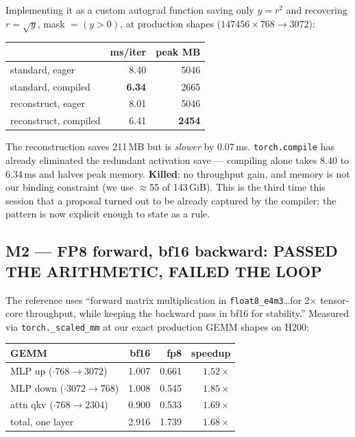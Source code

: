 \documentclass{article}
\begin{document}
Implementing it as a custom autograd function saving only $y=r^2$ and recovering $r=\sqrt{y}$, mask $=(y>0)$, at production shapes ($147456\times768\to3072$):

\begin{center}\begin{small}
\begin{tabular}{lrr}
\toprule
 & ms/iter & peak MB \\
\midrule
standard, eager & 8.40 & 5046 \\
standard, compiled & \textbf{6.34} & 2665 \\
reconstruct, eager & 8.01 & 5046 \\
reconstruct, compiled & 6.41 & \textbf{2454} \\
\bottomrule
\end{tabular}
\end{small}\end{center}

The reconstruction saves 211\,MB but is \emph{slower} by 0.07\,ms. \texttt{torch.compile} has already eliminated the redundant activation save --- compiling alone takes 8.40 to 6.34\,ms and halves peak memory. \textbf{Killed}: no throughput gain, and memory is not our binding constraint (we use $\approx$55 of 143\,GiB). This is the third time this session that a proposal turned out to be already captured by the compiler; the pattern is now explicit enough to state as a rule.

\subsection{M2 --- FP8 forward, bf16 backward: PASSED THE ARITHMETIC, FAILED THE LOOP}
The reference uses ``forward matrix multiplication in \texttt{float8\_e4m3}\ldots for 2$\times$ tensor-core throughput, while keeping the backward pass in bf16 for stability.'' Measured via \texttt{torch.\_scaled\_mm} at our exact production GEMM shapes on H200:

\begin{center}\begin{small}
\begin{tabular}{lrrr}
\toprule
GEMM & bf16 & fp8 & speedup \\
\midrule
MLP up ($\cdot768{\to}3072$) & 1.007 & 0.661 & $1.52\times$ \\
MLP down ($\cdot3072{\to}768$) & 1.008 & 0.545 & $1.85\times$ \\
attn qkv ($\cdot768{\to}2304$) & 0.900 & 0.533 & $1.69\times$ \\
\midrule
total, one layer & 2.916 & 1.739 & $\mathbf{1.68\times}$ \\
\bottomrule
\end{tabular}
\end{small}\end{center}
\end{document}

